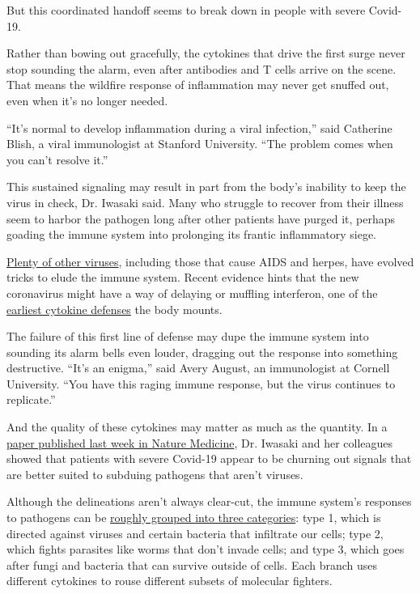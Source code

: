 But this coordinated handoff seems to break down in people with severe
Covid-19.

Rather than bowing out gracefully, the cytokines that drive the first
surge never stop sounding the alarm, even after antibodies and T cells
arrive on the scene. That means the wildfire response of inflammation
may never get snuffed out, even when it's no longer needed.

``It's normal to develop inflammation during a viral infection,'' said
Catherine Blish, a viral immunologist at Stanford University. ``The
problem comes when you can't resolve it.''

This sustained signaling may result in part from the body's inability to
keep the virus in check, Dr. Iwasaki said. Many who struggle to recover
from their illness seem to harbor the pathogen long after other patients
have purged it, perhaps goading the immune system into prolonging its
frantic inflammatory siege.

\href{https://www.nytimes3xbfgragh.onion/2020/07/31/opinion/coronavirus-antibodies-immunity.html}{Plenty
of other viruses}, including those that cause AIDS and herpes, have
evolved tricks to elude the immune system. Recent evidence hints that
the new coronavirus might have a way of delaying or muffling interferon,
one of the
\href{https://www.biorxiv.org/content/10.1101/2020.05.11.088179v1}{earliest
cytokine defenses} the body mounts.

The failure of this first line of defense may dupe the immune system
into sounding its alarm bells even louder, dragging out the response
into something destructive. ``It's an enigma,'' said Avery August, an
immunologist at Cornell University. ``You have this raging immune
response, but the virus continues to replicate.''

And the quality of these cytokines may matter as much as the quantity.
In a \href{https://www.nature.com/articles/s41586-020-2588-y}{paper
published last week in Nature Medicine}, Dr. Iwasaki and her colleagues
showed that patients with severe Covid-19 appear to be churning out
signals that are better suited to subduing pathogens that aren't
viruses.

Although the delineations aren't always clear-cut, the immune system's
responses to pathogens can be
\href{https://www.jacionline.org/article/S0091-6749(14)01585-1/fulltext}{roughly
grouped into three categories}: type 1, which is directed against
viruses and certain bacteria that infiltrate our cells; type 2, which
fights parasites like worms that don't invade cells; and type 3, which
goes after fungi and bacteria that can survive outside of cells. Each
branch uses different cytokines to rouse different subsets of molecular
fighters.

